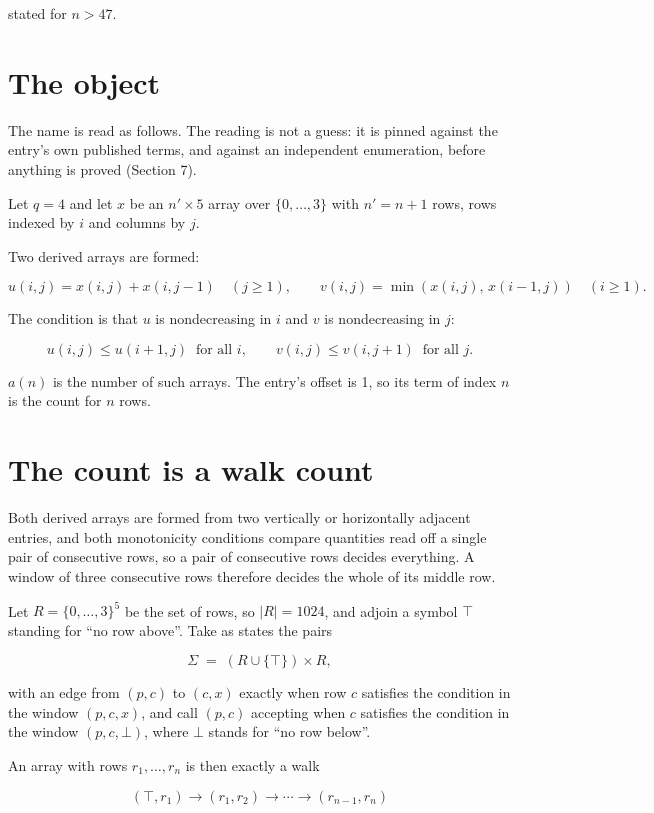 \documentclass[11pt]{article}
\theoremstyle{definition}
\begin{document}
stated for $n > 47$.

\section{The object}

The name is read as follows. The reading is not a guess: it is pinned against the entry's own published terms, and against an independent enumeration, before anything is proved (Section 7).

Let $q = 4$ and let $x$ be an $n' \times 5$ array over $\{0,\dots,3\}$ with $n' = n + 1$ rows, rows indexed by $i$ and columns by $j$.

Two derived arrays are formed:

\[u(i,j) = x(i,j) + x(i,j{-}1)\quad (j \ge 1), \qquad v(i,j) = \min(x(i,j),\,x(i{-}1,j))\quad (i \ge 1).\]

The condition is that $u$ is nondecreasing in $i$ and $v$ is nondecreasing in $j$:

\[u(i,j) \le u(i{+}1,j) \ \text{ for all } i, \qquad v(i,j) \le v(i,j{+}1) \ \text{ for all } j.\]

$a(n)$ is the number of such arrays. The entry's offset is 1, so its term of index $n$ is the count for $n$ rows.

\section{The count is a walk count}

Both derived arrays are formed from two vertically or horizontally adjacent entries, and both monotonicity conditions compare quantities read off a single pair of consecutive rows, so a pair of consecutive rows decides everything. A window of three consecutive rows therefore decides the whole of its middle row.

Let $R = \{0,\dots,3\}^{5}$ be the set of rows, so $|R| = 1024$, and adjoin a symbol $\top$ standing for ``no row above''. Take as states the pairs

\[\Sigma \;=\; (R \cup \{\top\}) \times R,\]

with an edge from $(p,c)$ to $(c,x)$ exactly when row $c$ satisfies the condition in the window $(p,c,x)$, and call $(p,c)$ accepting when $c$ satisfies the condition in the window $(p,c,\bot)$, where $\bot$ stands for ``no row below''.

An array with rows $r_1,\dots,r_n$ is then exactly a walk

\[(\top,r_1) \to (r_1,r_2) \to \cdots \to (r_{n-1},r_n)\]
\end{document}
